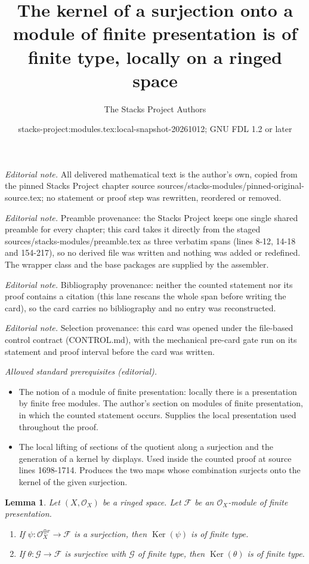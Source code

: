 \documentclass[10pt,a4paper]{amsart}
\title{The kernel of a surjection onto a module of finite presentation is of finite type, locally on a ringed space}
\author{The Stacks Project Authors}
\date{stacks-project:modules.tex:local-snapshot-20261012; GNU FDL 1.2 or later}
\theoremstyle{plain}
\newtheorem{lemma}[subsection]{Lemma}
\theoremstyle{definition}
\theoremstyle{remark}
\numberwithin{equation}{subsection}
\def\Ker{\mathop{\mathrm{Ker}}}
\begin{document}
\maketitle
\noindent\textit{Editorial note.} All delivered mathematical text is the author's own, copied from the pinned Stacks Project chapter source sources/stacks-modules/pinned-original-source.tex; no statement or proof step was rewritten, reordered or removed.\par\medskip
\noindent\textit{Editorial note.} Preamble provenance: the Stacks Project keeps one single shared preamble for every chapter; this card takes it directly from the staged sources/stacks-modules/preamble.tex as three verbatim spans (lines 8-12, 14-18 and 154-217), so no derived file was written and nothing was added or redefined. The wrapper class and the base packages are supplied by the assembler.\par\medskip
\noindent\textit{Editorial note.} Bibliography provenance: neither the counted statement nor its proof contains a citation (this lane rescans the whole span before writing the card), so the card carries no bibliography and no entry was reconstructed.\par\medskip
\noindent\textit{Editorial note.} Selection provenance: this card was opened under the file-based control contract (CONTROL.md), with the mechanical pre-card gate run on its statement and proof interval before the card was written.\par\medskip
\noindent\textit{Allowed standard prerequisites (editorial).}\begin{itemize}
\item The notion of a module of finite presentation: locally there is a presentation by finite free modules. The author's section on modules of finite presentation, in which the counted statement occurs. Supplies the local presentation used throughout the proof.
\item The local lifting of sections of the quotient along a surjection and the generation of a kernel by displays. Used inside the counted proof at source lines 1698-1714. Produces the two maps whose combination surjects onto the kernel of the given surjection.
\end{itemize}\medskip
\begin{lemma}
\label{lemma-kernel-surjection-finite-free-onto-finite-presentation}
Let $(X, \mathcal{O}_X)$ be a ringed space.
Let $\mathcal{F}$ be an $\mathcal{O}_X$-module of finite presentation.
\begin{enumerate}
\item If $\psi : \mathcal{O}_X^{\oplus r} \to \mathcal{F}$ is a surjection,
then $\Ker(\psi)$ is of finite type.
\item If $\theta : \mathcal{G} \to \mathcal{F}$ is surjective with
$\mathcal{G}$ of finite type, then $\Ker(\theta)$ is of finite type.
\end{enumerate}
\end{lemma}
\end{document}
